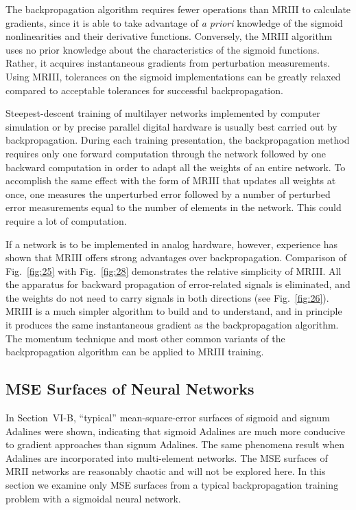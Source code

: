 \documentclass[10pt,twocolumn]{article}
\begin{document}
The backpropagation algorithm requires fewer operations than MRIII to calculate
gradients, since it is able to take advantage of \textit{a priori} knowledge of the
sigmoid nonlinearities and their derivative functions. Conversely, the MRIII
algorithm uses no prior knowledge about the characteristics of the sigmoid
functions. Rather, it acquires instantaneous gradients from perturbation
measurements. Using MRIII, tolerances on the sigmoid implementations can be greatly
relaxed compared to acceptable tolerances for successful backpropagation.

Steepest-descent training of multilayer networks implemented by computer simulation
or by precise parallel digital hardware is usually best carried out by
backpropagation. During each training presentation, the backpropagation method
requires only one forward computation through the network followed by one backward
computation in order to adapt all the weights of an entire network. To accomplish
the same effect with the form of MRIII that updates all weights at once, one
measures the unperturbed error followed by a number of perturbed error measurements
equal to the number of elements in the network. This could require a lot of
computation.

If a network is to be implemented in analog hardware, however, experience has shown
that MRIII offers strong advantages over backpropagation. Comparison of
Fig.~\ref{fig:25} with Fig.~\ref{fig:28} demonstrates the relative simplicity of
MRIII. All the apparatus for backward propagation of error-related signals is
eliminated, and the weights do not need to carry signals in both directions (see
Fig.~\ref{fig:26}). MRIII is a much simpler algorithm to build and to understand,
and in principle it produces the same instantaneous gradient as the backpropagation
algorithm. The momentum technique and most other common variants of the
backpropagation algorithm can be applied to MRIII training.

\subsection{MSE Surfaces of Neural Networks}
In Section~VI-B, ``typical'' mean-square-error surfaces of sigmoid and signum
Adalines were shown, indicating that sigmoid Adalines are much more conducive to
gradient approaches than signum Adalines. The same phenomena result when Adalines
are incorporated into multi-element networks. The MSE surfaces of MRII networks are
reasonably chaotic and will not be explored here. In this section we examine only
MSE surfaces from a typical backpropagation training problem with a sigmoidal neural
network.
\end{document}
